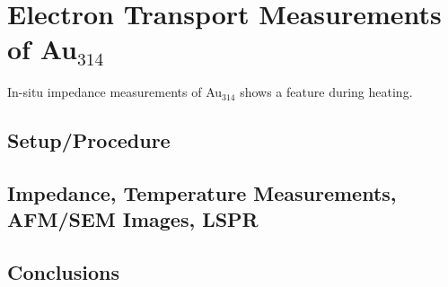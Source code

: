 \documentclass[12pt,oneside,english]{article}
\begin{document}
	\section{Electron Transport Measurements of Au$_{314}$}
	In-situ impedance measurements of Au$_{314}$ shows a feature during heating.
	\subsection{Setup/Procedure}
	\subsection{Impedance, Temperature Measurements, AFM/SEM Images, LSPR}
	\subsection{Conclusions}


\clearpage


\clearpage


\end{document}
